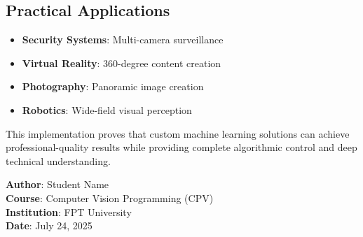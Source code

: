 \documentclass[12pt,a4paper]{article}
\begin{document}
\subsection{Practical Applications}
\begin{itemize}
    \item \textbf{Security Systems}: Multi-camera surveillance
    \item \textbf{Virtual Reality}: 360-degree content creation
    \item \textbf{Photography}: Panoramic image creation
    \item \textbf{Robotics}: Wide-field visual perception
\end{itemize}

This implementation proves that custom machine learning solutions can achieve professional-quality results while providing complete algorithmic control and deep technical understanding.

\vspace{1cm}
\noindent
\textbf{Author}: Student Name \\
\textbf{Course}: Computer Vision Programming (CPV) \\
\textbf{Institution}: FPT University \\
\textbf{Date}: July 24, 2025
\end{document}
